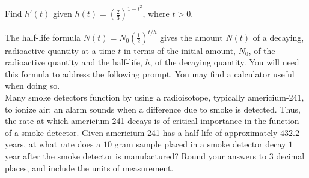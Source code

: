 \documentclass[10pt]{article}
\begin{document}
 Find $h'(t)$ given $h(t)=\left(\displaystyle\frac23\right)^{1-t^2}$, where $t>0$.

\newpage%

 The half-life formula $\displaystyle N(t) = N_0\left(\frac12\right)^{t/h}$ gives the amount $N(t)$ of a decaying, radioactive quantity at a time $t$ in terms of the initial amount, $N_0$, of the radioactive quantity and the half-life, $h$, of the decaying quantity. You will need this formula to address the following prompt. You may find a calculator useful when doing so.\\

Many smoke detectors function by using a radioisotope, typically americium-241, to ionize air; an alarm sounds when a difference due to smoke is detected. Thus, the rate at which americium-241 decays is of critical importance in the function of a smoke detector. Given americium-241 has a half-life of approximately $432.2$ years, at what rate does a $10$ gram sample placed in a smoke detector decay $1$ year after the smoke detector is manufactured? Round your answers to 3 decimal places, and include the units of measurement.
\end{document}
